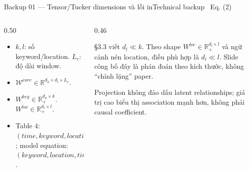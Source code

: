 \documentclass[aspectratio=169,11pt]{beamer}
\begin{document}
\begin{frame}[shrink=27]{Backup 01 --- Tensor/Tucker dimensions và lỗi in}{Technical backup \textperiodcentered\ Eq. (2)}
\vspace{3mm}
\begin{columns}[T,onlytextwidth]
\begin{column}{0.50\textwidth}
\begin{mathcard}
  \begin{itemize}
    \item $k,l$: số keyword/location.
    $L_c$: độ dài window.
    \item $\mathcal W^{core}\in\mathbb R^{d_k\times d_l\times L_c}$.
    \item $W^{key}\in\mathbb R_+^{d_k\times k}$.
    $W^{loc}\in\mathbb R_+^{d_l\times l}$.
    \item Table 4: $(time,keyword,location)$; model equation: $(keyword,location,time)$.
  \end{itemize}
\end{mathcard}
\end{column}
\begin{column}{0.46\textwidth}
\begin{caution}
  §3.3 viết $d_l\ll k$. Theo shape $W^{loc}\in\mathbb R_+^{d_l\times l}$ và ngữ cảnh nén location, điều phù hợp là $d_l\ll l$. Slide công bố đây là phán đoán theo kích thước, không “chỉnh lặng” paper.
\end{caution}
\vspace{3mm}
\begin{intuition}
  Projection không đảo dấu latent relationships; giá trị cao biểu thị association mạnh hơn, không phải causal coefficient.
\end{intuition}
\end{column}
\end{columns}
\vspace{2mm}
\end{frame}
\end{document}
